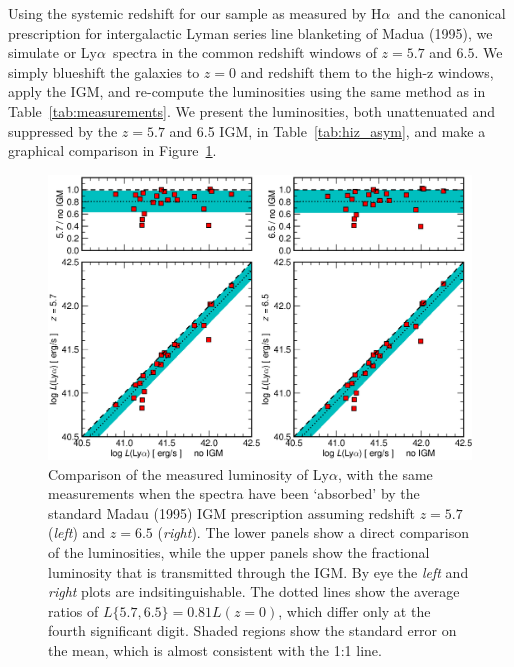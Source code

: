\documentclass[manuscript]{emulateapj}
\newcommand{\lya}{Ly$\alpha$}
\newcommand{\ha}{H$\alpha$}
\begin{document}
Using the systemic redshift for our sample as measured by \ha\ and the 
canonical prescription for intergalactic Lyman series line blanketing 
of Madua (1995), we simulate or \lya\ spectra in the common redshift windows 
of $z=5.7$ and $6.5$. We simply blueshift the galaxies to $z=0$ and redshift
them to the high-z windows, apply the IGM, and re-compute the luminosities 
using the same method as in Table~\ref{tab:measurements}. We present the 
luminosities, both unattenuated and suppressed by the $z=5.7$ and 6.5 IGM, 
in Table~\ref{tab:hiz_asym}, and make a graphical comparison in 
Figure~\ref{fig:igmlum}. 

\begin{figure}[t!]
   \centering
   \includegraphics[scale=.65]{lumcomp_igm.eps}
   \caption{Comparison of the measured luminosity of \lya, with the same measurements 
	when the spectra have been `absorbed' by the standard Madau (1995) IGM  prescription
	 assuming redshift $z=5.7$ (\emph{left}) and $z=6.5$ (\emph{right}). The lower panels
	 show a direct comparison of the luminosities, while the upper panels show the 
	 fractional luminosity that is transmitted through the IGM. By eye the \emph{left} 
	and \emph{right} plots are indsitinguishable. The dotted lines show the average 
	ratios of $L\{5.7,6.5\} = 0.81L(z=0)$, which differ only at the fourth significant 
  digit. Shaded regions show the standard error on the mean, which is almost consistent
	with the 1:1 line. 
\vspace{5mm}	 }
   \label{fig:igmlum}
\end{figure}
\end{document}
